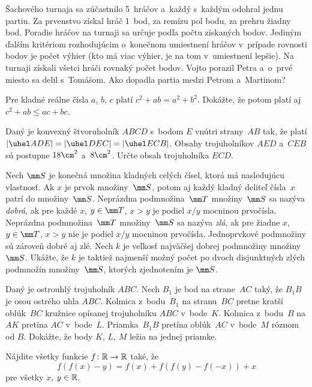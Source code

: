 {%
Šachového turnaja sa zúčastnilo 5~hráčov a~každý s~každým odohral jednu partiu. Za prvenstvo
získal hráč 1~bod, za remízu pol bodu, za prehru žiadny bod. Poradie hráčov na turnaji sa určuje
podľa počtu získaných bodov. Jediným ďalším kritériom rozhodujúcim o~konečnom umiestnení
hráčov v~prípade rovnosti bodov je počet výhier (kto má viac výhier, je na tom v~umiestnení lepšie).
Na turnaji získali všetci hráči rovnaký počet bodov. Vojto porazil Petra a~o~prvé miesto sa delil
s~Tomášom.
Ako dopadla partia medzi Petrom a~Martinom?}

{%
Pre kladné reálne čísla $a$, $b$, $c$ platí $c^2 + ab = a^2 + b^2$. Dokážte, že potom platí aj
$c^2 + ab \le ac + bc$.}

{%
Daný je konvexný štvoruholník $ABCD$ s~bodom $E$ vnútri strany~$AB$ tak, že platí
$|\uhel ADE| = |\uhel DEC| = |\uhel ECB|$. Obsahy trojuholníkov $AED$
a~$CEB$ sú postupne $18\cm^2$ a~$8\cm^2$. Určte obsah trojuholníka $ECD$.}

{%
Nech $\mm S$ je konečná množina kladných celých čísel, ktorá má nasledujúcu vlastnosť. Ak $x$ je prvok množiny~$\mm S$, potom aj každý kladný deliteľ čísla~$x$ patrí do množiny~$\mm S$. Neprázdna podmnožina~$\mm T$ množiny~$\mm S$ sa nazýva {\it dobrá}, ak pre každé $x$, $y\in\mm T$, $x>y$ je podiel $x/y$ mocninou prvočísla. Neprázdna podmnožina~$\mm T$ množiny~$\mm S$ sa nazýva {\it zlá}, ak pre žiadne $x$, $y\in\mm T$, $x>y$ nie je podiel $x/y$ mocninou prvočísla. Jednoprvkové podmnožiny sú zároveň dobré aj zlé. Nech $k$ je veľkosť najväčšej dobrej podmnožiny množiny~$\mm S$. Ukážte, že $k$ je taktiež najmenší možný počet po dvoch disjunktných zlých podmnožín množiny~$\mm S$, ktorých zjednotením je $\mm S$.
}

{%
Daný je ostrouhlý trojuholník $ABC$. Nech $B_1$ je bod na strane~$AC$ taký, že $B_1B$ je osou ostrého uhla $ABC$. Kolmica z~bodu~$B_1$ na stranu~$BC$ pretne kratší oblúk~$BC$ kružnice opísanej trojuholníku $ABC$ v~bode~$K$. Kolmica z~bodu~$B$ na $AK$ pretína $AC$ v~bode~$L$. Priamka~$B_1B$ pretína oblúk~$AC$ v~bode~$M$ rôznom od $B$. Dokážte, že body $K$, $L$, $M$ ležia na jednej priamke.
}

{%
Nájdite všetky funkcie $f\colon\Bbb R\to\Bbb R$ také, že
$$
f(f(x)-y) = f(x) +  f(f(y)-f(-x))+x
$$
pre všetky $x$, $y\in\Bbb R$.}

